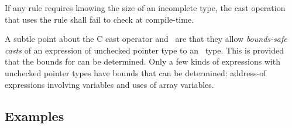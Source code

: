 If any rule requires knowing the size of an incomplete type,
the cast operation that uses the rule shall fail to check at compile-time.

A subtle point about the C cast operator and \dynamicboundscast\
are that they allow {\em bounds-safe casts} of an expression
 of unchecked pointer type to an
\arrayptr\ type. This is provided that the bounds for 
can be determined. Only a few kinds of expressions with unchecked pointer
types have bounds that can be determined: address-of expressions
involving variables and uses of array variables.

\subsection{Examples}
\label{section:pointer-cast-examples}

